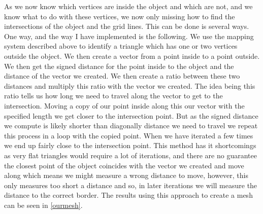 As we now know which vertices are inside the object and which are not, and we know what to do with these vertices, we now only missing how to find the intersections of the object and the grid lines. This can be done is several ways. One way, and the way I have implemented is the following. We use the mapping system described above to identify a triangle which has one or two vertices outside the object. We then create a vector from a point inside to a point outside. We then get the signed distance for the point inside to the object and the distance of the vector we created. We then create a ratio between these two distances and multiply this ratio with the vector we created. The idea being this ratio tells us how long we need to travel along the vector to get to the intersection. Moving a copy of our point inside along this our vector with the specified length we get closer to the intersection point. But as the signed distance we compute is likely shorter than diagonally distance we need to travel we repeat this process in a loop with the copied point. When we have iterated a few times we end up fairly close to the intersection point. This method has it shortcomings as very flat triangles would require a lot of iterations, and there are no guarantee the closest point of the object coincides with the vector we created and move along which means we might measure a wrong distance to move, however, this only measures too short a distance and so, in later iterations we will measure the distance to the correct border. The results using this approach to create a mesh can be seen in \autoref{ourmesh}.
